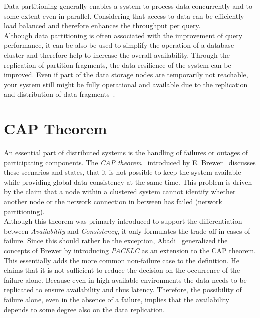 Data partitioning generally enables a system to process data concurrently and 
to some extent even in parallel. Considering that access to data can be 
efficiently load balanced and therefore enhances the throughput per query.\\

Although data partitioning is often associated with the improvement of query performance,
it can be also be used to simplify the operation of a database cluster and therefore help 
to increase the overall availability.
Through the replication of partition fragments, the data resilience of the system
can be improved. Even if part of the data storage nodes are temporarily not 
reachable, your system still might be fully operational and available due to the 
replication and distribution of data fragments~\cite{dbre2017}.







\section{CAP Theorem}
\label{sec:cap}
An essential part of distributed systems is the handling of failures or outages of participating components. 
The \emph{CAP theorem}~\cite{cap2002} introduced by E. Brewer~\cite{brewer:2000} discusses these scenarios and states, that it is not possible 
to keep the system available while providing global data consistency at the same time.
This problem is driven by the claim that a node within a clustered system cannot identify whether another node or the 
network connection in between has failed (network partitioning).\\
Although this theorem was primarly introduced to support the differentiation between \emph{Availability} and \emph{Consistency}, 
it only formulates the trade-off in cases of failure.
Since this should rather be the exception, Abadi~\cite{abadi2012} generalized the concepts of Brewer by introducing \emph{PACELC} as an extension to the CAP theorem.
This essentially adds the more common non-failure case to the definition.
He claims that it is not sufficient to reduce the decision on the occurrence of the failure alone. 
Because even in high-available environments the data needs to be replicated to ensure availability and thus latency. 
Therefore, the possibility of failure alone, even in the absence of a failure, implies that the availability depends to some degree also on the data replication.


